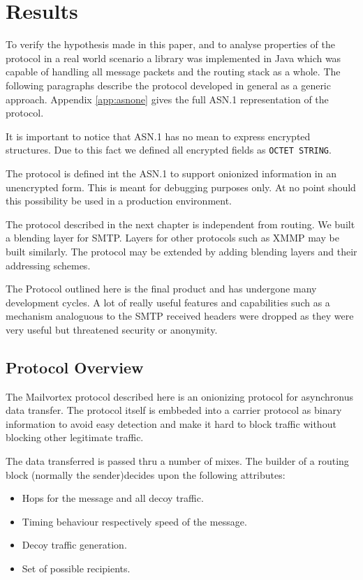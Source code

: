 
\part{Results}
To verify the hypothesis made in this paper, and to analyse properties of the protocol in a real world scenario a library was implemented in Java which was capable of handling all message packets and the routing stack as a whole. The following paragraphs describe the protocol developed in general as a generic approach. Appendix \ref{app:asnone} gives the full ASN.1 representation of the protocol. 

It is important to notice that ASN.1 has no mean to express encrypted structures. Due to this fact we defined all encrypted fields as \verb|OCTET STRING|. 

The protocol is defined int the ASN.1 to support onionized information in an unencrypted form. This is meant for debugging purposes only. At no point should this possibility be used in a production environment.

The protocol described in the next chapter is independent from routing. We built a blending layer for SMTP. Layers for other protocols such as XMMP may be built similarly. The protocol may be extended by adding blending layers and their addressing schemes.

The Protocol outlined here is the final product and has undergone many development cycles. A lot of really useful features and capabilities such as a mechanism analoguous to the SMTP received headers were dropped as they were very useful but threatened security or anonymity.

\chapter{Protocol Overview}
The Mailvortex protocol described here is an onionizing protocol for asynchronus data transfer. The protocol itself is embbeded into a carrier protocol as binary information to avoid easy detection and make it hard to block traffic without blocking other legitimate traffic.

The data transferred is passed thru a number of mixes. The builder of a routing block (normally the sender)decides upon the following attributes:
\begin{itemize}
	\item Hops for the message and all decoy traffic.
	\item Timing behaviour respectively speed of the message.
	\item Decoy traffic generation.
	\item Set of possible recipients.
\end{itemize}

